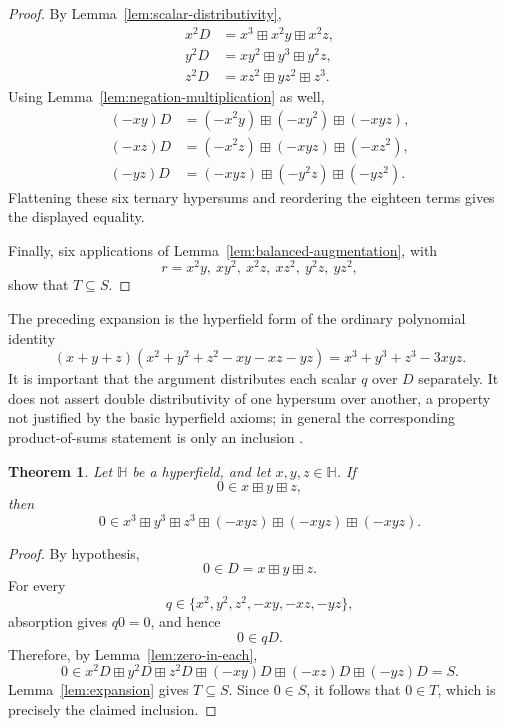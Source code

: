 \documentclass[11pt]{article}
\newtheorem{theorem}{Theorem}
\newcommand{\hplus}{\boxplus}
\begin{document}
\begin{proof}
By Lemma~\ref{lem:scalar-distributivity},
\begin{align*}
x^2D&=x^3\hplus x^2y\hplus x^2z,\\
y^2D&=xy^2\hplus y^3\hplus y^2z,\\
z^2D&=xz^2\hplus yz^2\hplus z^3.
\end{align*}
Using Lemma~\ref{lem:negation-multiplication} as well,
\begin{align*}
(-xy)D&=(-x^2y)\hplus(-xy^2)\hplus(-xyz),\\
(-xz)D&=(-x^2z)\hplus(-xyz)\hplus(-xz^2),\\
(-yz)D&=(-xyz)\hplus(-y^2z)\hplus(-yz^2).
\end{align*}
Flattening these six ternary hypersums and reordering the eighteen terms gives
the displayed equality.

Finally, six applications of Lemma~\ref{lem:balanced-augmentation}, with
\[
r=x^2y,\ xy^2,\ x^2z,\ xz^2,\ y^2z,\ yz^2,
\]
show that \(T\subseteq S\).
\end{proof}

The preceding expansion is the hyperfield form of the ordinary polynomial
identity
\[
(x+y+z)(x^2+y^2+z^2-xy-xz-yz)
=x^3+y^3+z^3-3xyz.
\]
It is important that the argument distributes each scalar \(q\) over \(D\)
separately. It does not assert double distributivity of one hypersum over
another, a property not justified by the basic hyperfield axioms; in general
the corresponding product-of-sums statement is only an inclusion
\cite{Viro,ViroNotes}.

\begin{theorem}
Let \(\mathbb H\) be a hyperfield, and let \(x,y,z\in\mathbb H\). If
\[
0\in x\hplus y\hplus z,
\]
then
\[
0\in x^3\hplus y^3\hplus z^3
\hplus(-xyz)\hplus(-xyz)\hplus(-xyz).
\]
\end{theorem}

\begin{proof}
By hypothesis,
\[
0\in D=x\hplus y\hplus z.
\]
For every
\[
q\in\{x^2,y^2,z^2,-xy,-xz,-yz\},
\]
absorption gives \(q0=0\), and hence
\[
0\in qD.
\]
Therefore, by Lemma~\ref{lem:zero-in-each},
\[
0\in
x^2D\hplus y^2D\hplus z^2D
\hplus(-xy)D\hplus(-xz)D\hplus(-yz)D
=S.
\]
Lemma~\ref{lem:expansion} gives \(T\subseteq S\). Since \(0\in S\), it follows
that \(0\in T\), which is precisely the claimed inclusion.
\end{proof}
\end{document}
